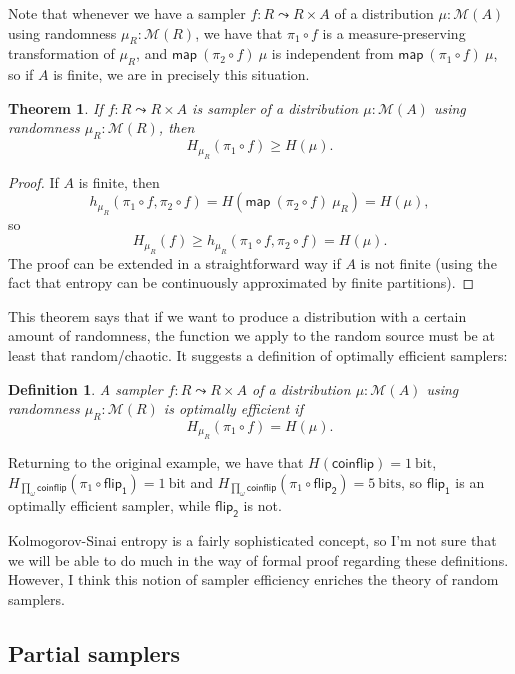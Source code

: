\documentclass{article}           %
\newtheorem{definition}{Definition}
\newtheorem{theorem}{Theorem}
\newcommand{\map}[2]{\mathsf{map}\ {#1}\ {#2}}
\newcommand{\Dist}[1]{\mathcal{M}({#1})}
\newcommand{\coinflip}{\mathsf{coinflip}}
\newcommand{\un}[1]{\ \mathrm{#1}}
\begin{document}
Note that whenever we have a sampler $f : R \leadsto R \times A$ of a distribution $\mu : \Dist{A}$ using randomness $\mu_R : \Dist{R}$, we have that $\pi_1 \circ f$ is a measure-preserving transformation of $\mu_R$, and $\map{(\pi_2 \circ f)}{\mu}$ is independent from $\map{(\pi_1 \circ f)}{\mu}$, so if $A$ is finite, we are in precisely this situation.
\begin{theorem}
If $f : R \leadsto R \times A$ is sampler of a distribution $\mu : \Dist{A}$ using randomness $\mu_R : \Dist{R}$, then
\[
H_{\mu_R}(\pi_1 \circ f) \ge H(\mu).
\]
\end{theorem}
\begin{proof}
If $A$ is finite, then 
\[
h_{\mu_R}(\pi_1 \circ f, \pi_2 \circ f) = H(\map{(\pi_2 \circ f)}{\mu_R}) = H(\mu),
\]
so
\[
H_{\mu_R}(f) \ge h_{\mu_R}(\pi_1 \circ f, \pi_2 \circ f) = H(\mu).
\]
The proof can be extended in a straightforward way if $A$ is not finite (using the fact that entropy can be continuously approximated by finite partitions).
\end{proof}

This theorem says that if we want to produce a distribution with a certain amount of randomness, the function we apply to the random source must be at least that random/chaotic. It suggests a definition of optimally efficient samplers:

\begin{definition}
A sampler $f : R \leadsto R \times A$ of a distribution $\mu : \Dist{A}$ using randomness $\mu_R : \Dist{R}$ is \emph{optimally efficient} if
\[
H_{\mu_R}(\pi_1 \circ f) = H(\mu).
\]
\end{definition}

Returning to the original example, we have that $H(\coinflip) = 1\un{bit}$, $H_{\prod_\omega \coinflip}(\pi_1 \circ \mathsf{flip_1}) = 1 \un{bit}$ and $H_{\prod_\omega \coinflip}(\pi_1 \circ \mathsf{flip_2}) = 5 \un{bits}$, so $\mathsf{flip_1}$ is an optimally efficient sampler, while $\mathsf{flip_2}$ is not.

Kolmogorov-Sinai entropy is a fairly sophisticated concept, so I'm not sure that we will be able to do much in the way of formal proof regarding these definitions. However, I think this notion of sampler efficiency enriches the theory of random samplers.

\subsection{Partial samplers}
\end{document}
